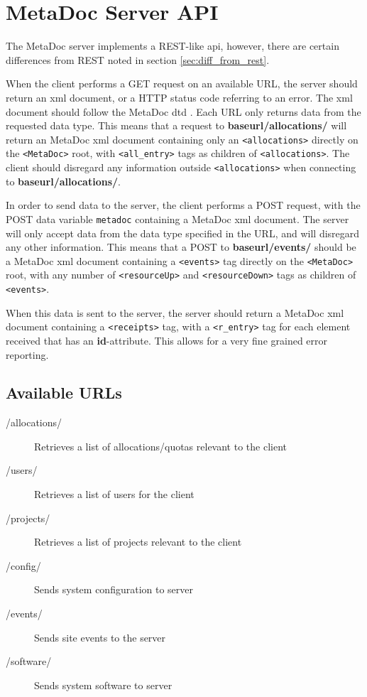 \newpage
\section{MetaDoc Server API}
\label{sec:server_api}

The MetaDoc server implements a REST-like \gls{api}, however, there are certain
differences from REST noted in section \ref{sec:diff_from_rest}.

When the client performs a GET request on an available URL, the server should
return an \gls{xml} document, or a HTTP status code referring to an error.  The
\gls{xml} document should follow the MetaDoc \gls{dtd} \cite{metadoc_dtd}. Each
URL only returns data from the requested data type. This means that a request
to \textbf{baseurl/allocations/} will return an MetaDoc \gls{xml} document
containing only an \texttt{<allocations>} directly on the \texttt{<MetaDoc>}
root, with \texttt{<all\_entry>} tags as children of \texttt{<allocations>}.
The client should disregard any information outside \texttt{<allocations>} when
connecting to \textbf{baseurl/allocations/}. 

In order to send data to the server, the client performs a POST request, with
the POST data variable \texttt{metadoc} containing a MetaDoc \gls{xml}
document. The server will only accept data from the data type specified in the
URL, and will disregard any other information. This means that a POST to
\textbf{baseurl/events/} should be a MetaDoc \gls{xml} document containing a
\texttt{<events>} tag directly on the \texttt{<MetaDoc>} root, with any number
of \texttt{<resourceUp>} and \texttt{<resourceDown>} tags as children of
\texttt{<events>}. 

When this data is sent to the server, the server should return a MetaDoc
\gls{xml} document containing a \texttt{<receipts>} tag, with a
\texttt{<r\_entry>} tag for each element received that has an
\textbf{id}-attribute. This allows for a very fine grained error reporting.

\subsection{Available URLs}

\begin{description}
    \item[/allocations/] Retrieves a list of allocations/quotas relevant
        to the client
    \item[/users/] Retrieves a list of users for the client
    \item[/projects/] Retrieves a list of projects relevant to the
        client
    \item[/config/] Sends system configuration to server
    \item[/events/] Sends site events to the server
    \item[/software/] Sends system software to server
\end{description}

